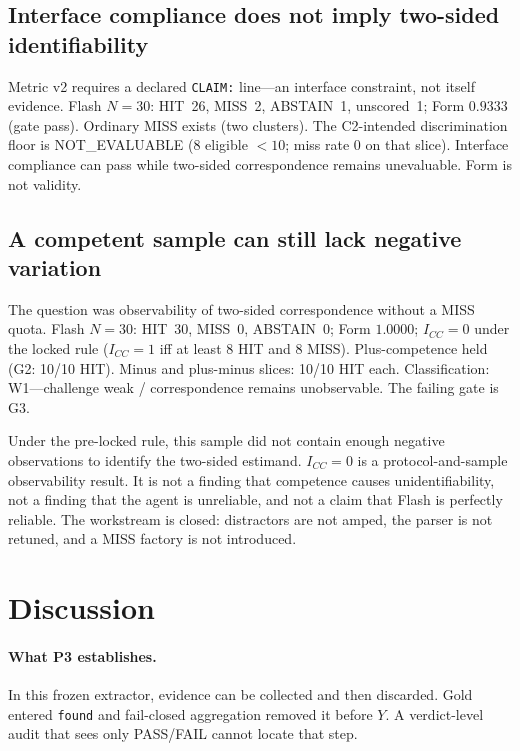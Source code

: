 \documentclass[sigconf,anonymous]{aamas}
\begin{document}
\subsection{Interface compliance does not imply two-sided identifiability}
\label{sec:p4c2}

Metric v2 requires a declared \texttt{CLAIM:} line---an interface constraint, not itself evidence.
Flash $N=30$: HIT~26, MISS~2, ABSTAIN~1, unscored~1; Form $0.9333$ (gate pass).
Ordinary MISS exists (two clusters).
The C2-intended discrimination floor is NOT\_EVALUABLE (8 eligible $<10$; miss rate $0$ on that slice).
Interface compliance can pass while two-sided correspondence remains unevaluable.
Form is not validity.

\subsection{A competent sample can still lack negative variation}
\label{sec:p4d}

The question was observability of two-sided correspondence without a MISS quota.
Flash $N=30$: HIT~30, MISS~0, ABSTAIN~0; Form $1.0000$; $I_{CC}=0$ under the locked rule ($I_{CC}=1$ iff at least 8 HIT and 8 MISS).
Plus-competence held (G2: 10/10 HIT).
Minus and plus-minus slices: 10/10 HIT each.
Classification: W1---challenge weak / correspondence remains unobservable.
The failing gate is G3.

Under the pre-locked rule, this sample did not contain enough negative observations to identify the two-sided estimand.
$I_{CC}=0$ is a protocol-and-sample observability result.
It is not a finding that competence causes unidentifiability, not a finding that the agent is unreliable, and not a claim that Flash is perfectly reliable.
The workstream is closed: distractors are not amped, the parser is not retuned, and a MISS factory is not introduced.

\section{Discussion}
\label{sec:discuss}

\paragraph{What P3 establishes.}
In this frozen extractor, evidence can be collected and then discarded.
Gold entered \texttt{found} and fail-closed aggregation removed it before $Y$.
A verdict-level audit that sees only PASS/FAIL cannot locate that step.
\end{document}
